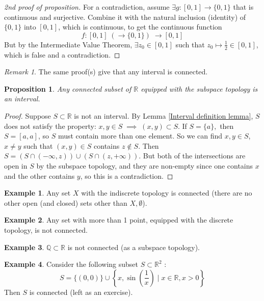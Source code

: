 \documentclass{article}
\theoremstyle{definition}
\newtheorem{exmp}{Example}[section]
\theoremstyle{plain}%
\newtheorem{prop}[thm]{Proposition}
\theoremstyle{remark}
\newtheorem*{rem}{Remark}
\newcommand{\union}{\cup}
\newcommand{\intersection}{\cap}
\newcommand{\R}{\mathbb{R}}
\newcommand{\Q}{\mathbb{Q}}
\begin{document}
\begin{proof}[2nd proof of proposition]
    For a contradiction, assume $\exists g: [0,1] \to \{0,1\}$ that is continuous and surjective. Combine it with the natural inclusion (identity) of $\{0,1\}$ into $[0,1]$, which is continuous, to get the continuous function \[f : [0,1] \; \left(\to \{0,1\}\right) \; \to [0,1]\] But by the Intermediate Value Theorem, $\exists z_0 \in [0,1]$ such that $z_0 \mapsto \frac{1}{2} \in [0,1]$, which is false and a contradiction.
\end{proof}

\begin{rem}
    The same proof(s) give that any interval is connected.
\end{rem}

\begin{prop}
    Any connected subset of $\R$ equipped with the subspace topology is an interval.
\end{prop}

\begin{proof}
    Suppose $S \subset \R$ is not an interval. By Lemma \ref{Interval definition lemma}, $S$ does not satisfy the property: $x,y \in S \; \implies \; (x,y) \subset S$. If $S = \{a\},$ then $S=[a,a]$, so $S$ must contain more than one element. So we can find $x,y \in S$, $x \ne y$ such that $(x,y) \in S$ contains $z \not\in S$. Then $S = \left(S \intersection (-\infty, z) \right) \union \left( S \intersection (z, +\infty) \right)$. But both of the intersections are open in $S$ by the subspace topology, and they are non-empty since one contains $x$ and the other contains $y$, so this is a contradiction.
\end{proof}

\begin{exmp}
    Any set $X$ with the indiscrete topology is connected (there are no other open (and closed) sets other than $X, \emptyset$).
\end{exmp}

\begin{exmp}
    Any set with more than 1 point, equipped with the discrete topology, is not connected.
\end{exmp}

\begin{exmp}
    $\Q \subset \R$ is not connected (as a subspace topology).
\end{exmp}

\begin{exmp}
    Consider the following subset $S \subset \R^2$ : \[S = \{(0,0)\} \union \left\{x, \sin \left(\frac{1}{x}\right) \; | \; x \in \R, x > 0\right\}\] Then $S$ is connected (left as an exercise).
\end{exmp}
\end{document}
